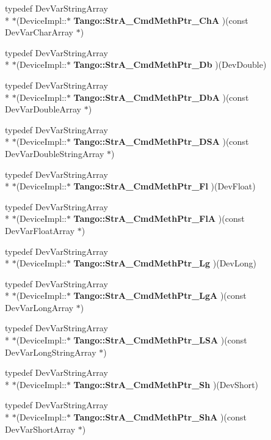 \begin{DoxyCompactItemize}
\item 
typedef Dev\-Var\-String\-Array \\*
$\ast$(Device\-Impl\-::$\ast$ {\bf Tango\-::\-Str\-A\-\_\-\-Cmd\-Meth\-Ptr\-\_\-\-Ch\-A} )(const Dev\-Var\-Char\-Array $\ast$)
\item 
typedef Dev\-Var\-String\-Array \\*
$\ast$(Device\-Impl\-::$\ast$ {\bf Tango\-::\-Str\-A\-\_\-\-Cmd\-Meth\-Ptr\-\_\-\-Db} )(Dev\-Double)
\item 
typedef Dev\-Var\-String\-Array \\*
$\ast$(Device\-Impl\-::$\ast$ {\bf Tango\-::\-Str\-A\-\_\-\-Cmd\-Meth\-Ptr\-\_\-\-Db\-A} )(const Dev\-Var\-Double\-Array $\ast$)
\item 
typedef Dev\-Var\-String\-Array \\*
$\ast$(Device\-Impl\-::$\ast$ {\bf Tango\-::\-Str\-A\-\_\-\-Cmd\-Meth\-Ptr\-\_\-\-D\-S\-A} )(const Dev\-Var\-Double\-String\-Array $\ast$)
\item 
typedef Dev\-Var\-String\-Array \\*
$\ast$(Device\-Impl\-::$\ast$ {\bf Tango\-::\-Str\-A\-\_\-\-Cmd\-Meth\-Ptr\-\_\-\-Fl} )(Dev\-Float)
\item 
typedef Dev\-Var\-String\-Array \\*
$\ast$(Device\-Impl\-::$\ast$ {\bf Tango\-::\-Str\-A\-\_\-\-Cmd\-Meth\-Ptr\-\_\-\-Fl\-A} )(const Dev\-Var\-Float\-Array $\ast$)
\item 
typedef Dev\-Var\-String\-Array \\*
$\ast$(Device\-Impl\-::$\ast$ {\bf Tango\-::\-Str\-A\-\_\-\-Cmd\-Meth\-Ptr\-\_\-\-Lg} )(Dev\-Long)
\item 
typedef Dev\-Var\-String\-Array \\*
$\ast$(Device\-Impl\-::$\ast$ {\bf Tango\-::\-Str\-A\-\_\-\-Cmd\-Meth\-Ptr\-\_\-\-Lg\-A} )(const Dev\-Var\-Long\-Array $\ast$)
\item 
typedef Dev\-Var\-String\-Array \\*
$\ast$(Device\-Impl\-::$\ast$ {\bf Tango\-::\-Str\-A\-\_\-\-Cmd\-Meth\-Ptr\-\_\-\-L\-S\-A} )(const Dev\-Var\-Long\-String\-Array $\ast$)
\item 
typedef Dev\-Var\-String\-Array \\*
$\ast$(Device\-Impl\-::$\ast$ {\bf Tango\-::\-Str\-A\-\_\-\-Cmd\-Meth\-Ptr\-\_\-\-Sh} )(Dev\-Short)
\item 
typedef Dev\-Var\-String\-Array \\*
$\ast$(Device\-Impl\-::$\ast$ {\bf Tango\-::\-Str\-A\-\_\-\-Cmd\-Meth\-Ptr\-\_\-\-Sh\-A} )(const Dev\-Var\-Short\-Array $\ast$)

\end{DoxyCompactItemize}
